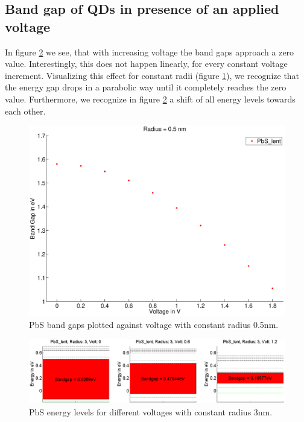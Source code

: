 \newpage
\subsection{Band gap of QDs in presence of an applied voltage}
	In figure \ref{fig:EnergyLevels_Volt} we see, that with increasing voltage the band gaps approach a zero value. Interestingly, this does not happen linearly, 
	for every constant voltage increment.	Visualizing this effect for constant radii (figure \ref{fig:BandGap_Volt}), we recognize that the energy gap drops
	in a	parabolic way until it completely reaches the zero value. Furthermore, we recognize in figure \ref{fig:EnergyLevels_Volt} a shift of all energy 
	levels towards each other.
	\begin{figure}
		\includegraphics[width=\textwidth]{Fig/Plots/BandGap_Volt.eps}
		\caption{PbS band gaps plotted against voltage with constant radius 0.5nm.}
		\label{fig:BandGap_Volt}
	\end{figure}
	\begin{figure}
		\includegraphics[width=\textwidth]{Fig/Plots/EnergyLevels.eps}
		\caption{PbS energy levels for different voltages with constant radius 3nm.}
		\label{fig:EnergyLevels_Volt}
	\end{figure}
	
